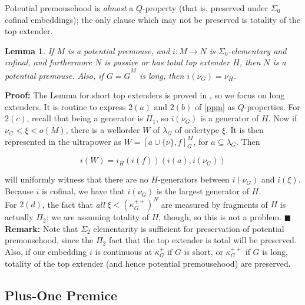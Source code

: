 \documentclass[12pt]{article}
\newtheorem{lem}[thm]{Lemma}
\begin{document}
\bigskip	
	
	Potential premousehood is \textit{almost} a $Q$-property (that is, preserved under $\Sigma_0$ cofinal embeddings); the only clause which may not be preserved is totality of the top extender.\\
	
\begin{lem} \label{ppm up-pres} 
If $M$ is a potential premouse, and $i : M \longrightarrow N$ is $\Sigma_0$-elementary and cofinal, and furthermore $N$ is passive or has total top extender $H$, then $N$ is a potential premouse.  Also, if $G = \dot{G}^M$ is long, then $i (\nu_{G}) = \nu_{H}$.

\end{lem}
	
\textbf{Proof:} The Lemma for short top extenders is proved in \cite{zeman book}, so we focus on long extenders.  It is routine to express $2(a)$ and $2(b)$ of \ref{ppm} as $Q$-properties.  For $2(c)$, recall that being a generator is $\Pi_1$, so $i (\nu_{G})$ is a generator of $H$.  Now if $\nu_G < \xi < o(M)$, there is a wellorder $W$ of $\lambda_G$ of ordertype $\xi$.  It is then represented in the ultrapower as $W = [a \cup \{\nu \} , f ]_G^M$, for $a \subseteq \lambda_G$.  Then

\[
i(W) = i_{H} (i(f))(i(a), i(\nu_G))
\]

will uniformly witness that there are no $H$-generators between $i(\nu_G)$ and $i(\xi)$.  Because $i$ is cofinal, we have that $i(\nu_G)$ is the largest generator of $H$.\\

For $2(d)$, the fact that \textit{all} $\xi < (\kappa_G^{++})^N$ are measured by fragments of $H$ is actually $\Pi_2$; we are assuming totality of $H$, though, so this is not a problem. $\blacksquare$\\
	
\textbf{Remark:} Note that $\Sigma_2$ elementarity is sufficient for preservation of potential premousehood, since the $\Pi_2$ fact that the top extender is total will be preserved.  Also, if our embedding $i$ is continuous at $\kappa_G^+$ if $G$ is short, or $\kappa_G^{++}$ if $G$ is long, totality of the top extender (and hence potential premousehood) are preserved.\\
	
	
	
\subsection{Plus-One Premice}
\end{document}
